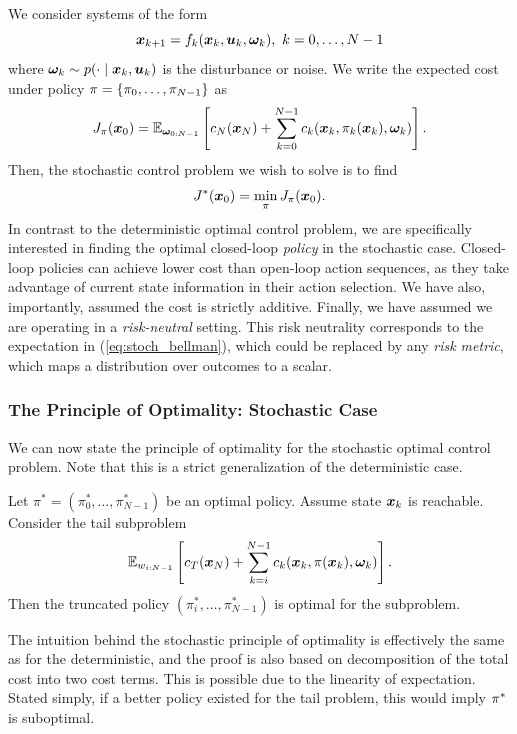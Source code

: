 We consider systems of the form
\begin{equation}
    \bm{x}_{k+1} = f_k(\bm{x}_k,\bm{u}_k,\bm{\omega}_k), \,\, k=0,\ldots,N-1
\end{equation}
where $\bm{\omega}_k \sim p(\cdot \mid \bm{x}_k, \bm{u}_k)$ is the disturbance or noise. We write the expected cost under policy $\pi = \{\pi_0, \ldots, \pi_{N-1}\}$ as
\begin{equation}
    \label{eq:stoch_bellman}
    J_\pi(\bm{x}_0) = \mathbb{E}_{\bm{\omega}_{0:N-1}} \left[ c_N(\bm{x}_N) + \sum_{k=0}^{N-1} c_k(\bm{x}_k,\pi_k(\bm{x}_k),\bm{\omega}_k) \right].
\end{equation}
Then, the stochastic control problem we wish to solve is to find
\begin{equation}
    J^*(\bm{x}_0) = \min_\pi J_\pi(\bm{x}_0).
\end{equation}
In contrast to the deterministic optimal control problem, we are specifically interested in finding the optimal closed-loop \textit{policy} in the stochastic case. Closed-loop policies can achieve lower cost than open-loop action sequences, as they take advantage of current state information in their action selection. We have also, importantly, assumed the cost is strictly additive. Finally, we have assumed we are operating in a \textit{risk-neutral} setting. This risk neutrality corresponds to the expectation in (\ref{eq:stoch_bellman}), which could be replaced by any \textit{risk metric}, which maps a distribution over outcomes to a scalar.

\subsubsection{The Principle of Optimality: Stochastic Case}

We can now state the principle of optimality for the stochastic optimal control problem. Note that this is a strict generalization of the deterministic case. 

\begin{theorem}
Let $\pi^* = (\pi_0^*, \ldots, \pi^*_{N-1})$ be an optimal policy. Assume state $\bm{x}_k$ is reachable. Consider the tail subproblem
\begin{equation}
\mathbb{E}_{w_{i:N-1}}\left[ c_T(\bm{x}_N) + \sum_{k=i}^{N-1} c_k(\bm{x}_k,\pi(\bm{x}_k),\bm{\omega}_k) \right].
\end{equation}
Then the truncated policy $(\pi_i^*, \ldots, \pi^*_{N-1})$ is optimal for the subproblem.
\end{theorem}
The intuition behind the stochastic principle of optimality is effectively the same as for the deterministic, and the proof is also based on decomposition of the total cost into two cost terms. This is possible due to the linearity of expectation. Stated simply, if a better policy existed for the tail problem, this would imply $\pi^*$ is suboptimal. 

